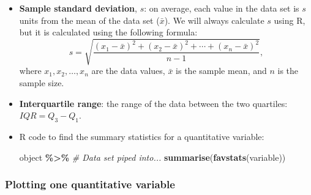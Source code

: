 \documentclass[
]{report}
\newenvironment{Shaded}{\begin{snugshade}}{\end{snugshade}}
\newcommand{\CommentTok}[1]{\textcolor[rgb]{0.56,0.35,0.01}{\textit{#1}}}
\newcommand{\FunctionTok}[1]{\textcolor[rgb]{0.13,0.29,0.53}{\textbf{#1}}}
\newcommand{\NormalTok}[1]{#1}
\newcommand{\SpecialCharTok}[1]{\textcolor[rgb]{0.81,0.36,0.00}{\textbf{#1}}}
\begin{document}
\begin{itemize}
\item
  \textbf{Sample standard deviation}, \(s\): on average, each value in the data set is \(s\) units from the mean of the data set (\(\bar{x}\)). We will always calculate \(s\) using R, but it is calculated using the following formula:
  \[
  s = \sqrt{\frac{(x_1-\bar{x})^2 + (x_2-\bar{x})^2 + \cdots + (x_n-\bar{x})^2}{n-1}},
  \]
  where \(x_1, x_2, \ldots, x_n\) are the data values, \(\bar{x}\) is the sample mean, and \(n\) is the sample size.
\item
  \textbf{Interquartile range}: the range of the data between the two quartiles: \(IQR = Q_3-Q_1\).
\item
  R code to find the summary statistics for a quantitative variable:

\begin{Shaded}
\begin{Highlighting}[]
\NormalTok{object }\SpecialCharTok{\%\textgreater{}\%} \CommentTok{\# Data set piped into...}
    \FunctionTok{summarise}\NormalTok{(}\FunctionTok{favstats}\NormalTok{(variable))}
\end{Highlighting}
\end{Shaded}
\end{itemize}

\subsubsection*{Plotting one quantitative variable}\label{plotting-one-quantitative-variable}
\end{document}
